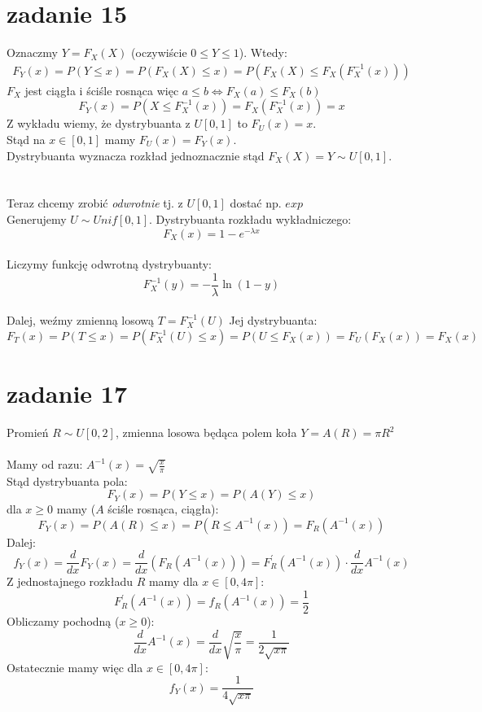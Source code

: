 \documentclass{article}
\begin{document}
\section{zadanie 15}
Oznaczmy $Y = F_X(X)$ (oczywiście $0 \leq Y \leq 1$). Wtedy:
\begin{align*}
F_Y(x) = P(Y\leq x)= P(F_X(X) \leq x) =P(F_X(X) \leq F_X(F_X^{-1}(x)))
\end{align*}
$F_X$ jest ciągła i ściśle rosnąca więc $a \leq b \iff F_X(a) \leq F_X(b)$
$$
F_Y(x) = P(X \leq F_X^{-1}(x)) = F_X(F_X^{-1}(x)) = x
$$
Z wykładu wiemy, że dystrybuanta z $U[0,1]$ to $F_U(x) = x$.\\
Stąd na $x \in [0,1]$ mamy $F_U(x) = F_Y(x)$. \\Dystrybuanta wyznacza rozkład jednoznacznie stąd $F_X(X) = Y \sim U[0,1]$.\\\\\\
Teraz chcemy zrobić \textit{odwrotnie} tj. z $U[0,1]$ dostać np. $exp$\\
Generujemy $U \sim Unif[0,1].$ Dystrybuanta rozkładu wykładniczego: $$F_X(x) = 1-e^{-\lambda x}$$\\
Liczymy funkcję odwrotną dystrybuanty: $$F_X^{-1}(y) = -\frac1\lambda \ln(1-y)$$\\
Dalej, weźmy zmienną losową $T = F_X^{-1}(U)$ Jej dystrybuanta:
$$
F_T(x) = P(T \leq x) = P(F_X^{-1}(U) \leq x) = P(U \leq F_X(x)) = F_U(F_X(x)) = F_X(x)
$$

\newpage
\section{zadanie 17}
Promień $R \sim U[0,2]$, %
zmienna losowa będąca polem koła $Y = A(R) =  \pi R^2$\\\\
Mamy od razu: $A^{-1}(x) = \sqrt{\frac x \pi}$ \\Stąd dystrybuanta pola:
$$
F_Y(x) = P(Y \leq x) = P(A(Y) \leq x)
$$
dla $x \geq 0$ mamy ($A$ ściśle rosnąca, ciągła):
$$
F_Y(x) = P(A(R) \leq x) = P(R \leq A^{-1}(x)) = F_R(A^{-1}(x))
$$
Dalej:
$$
f_Y(x) = \frac{d}{dx}F_Y(x) = \frac{d}{dx} \left ( F_R(A^{-1}(x))\right) = F_R^\prime(A^{-1}(x)) \cdot \frac{d}{dx}A^{-1}(x)
$$
Z jednostajnego rozkładu $R$ mamy dla $x \in [0, 4\pi]$:
$$
F_R^\prime(A^{-1}(x)) = f_R(A^{-1}(x)) = \frac 1 2
$$
Obliczamy pochodną ($x\geq0$):
$$
\frac{d}{dx}A^{-1}(x) = \frac{d}{dx}\sqrt{\frac x \pi} = \frac{1}{2\sqrt{x\pi}}
$$
Ostatecznie mamy więc dla $x \in [0,4\pi]$:
$$
f_Y(x) = \frac{1}{4\sqrt{x\pi}}
$$
\end{document}
